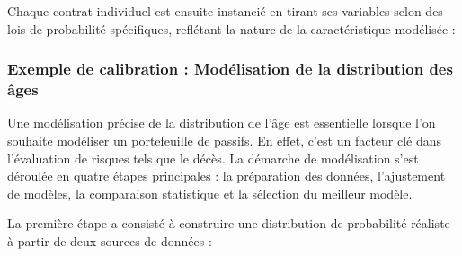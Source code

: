 Chaque contrat individuel est ensuite instancié en tirant ses variables selon des lois de probabilité spécifiques, reflétant la nature de la caractéristique modélisée :
\subsubsection{Exemple de calibration : Modélisation de la distribution des âges}
Une modélisation précise de la distribution de l'âge est essentielle lorsque l'on souhaite modéliser un portefeuille de passifs. En effet, c'est un facteur clé dans l'évaluation de risques tels que le décès. La démarche de modélisation s'est déroulée en quatre étapes principales : la préparation des données, l'ajustement de modèles, la comparaison statistique et la sélection du meilleur modèle.

La première étape a consisté à construire une distribution de probabilité réaliste à partir de deux sources de données :
